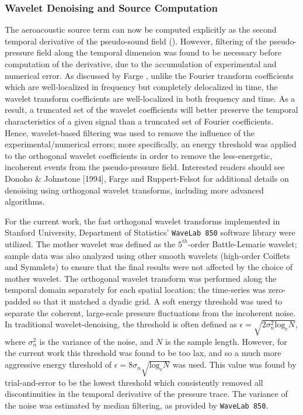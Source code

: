 \subsubsection{Wavelet Denoising and Source Computation}
The aeroacoustic source term can now be computed explicitly as the second temporal derivative of the pseudo-sound field ().
However, filtering of the pseudo-pressure field along the temporal dimension was found to be necessary before computation of the derivative, due to the accumulation of experimental and numerical error.
As discussed by Farge \citep{Farge1992}, unlike the Fourier transform coefficients which are well-localized in frequency but completely delocalized in time, the wavelet transform coefficients are well-localized in both frequency and time. 
As a result, a truncated set of the wavelet coefficients will better preserve the temporal characteristics of a given signal than a truncated set of Fourier coefficients.
Hence, wavelet-based filtering was used to remove the influence of the experimental/numerical errors; more specifically, an energy threshold was applied to the orthogonal wavelet coefficients in order to remove the less-energetic, incoherent events from the pseudo-pressure field.
Interested readers should see Donoho \& Johnstone [1994], Farge \etal [1999] and Ruppert-Felsot \etal [2009] for additional details on denoising using orthogonal wavelet transforms, including more advanced algorithms.

For the current work, the fast orthogonal wavelet transforms implemented in Stanford University, Department of Statistics' \texttt{WaveLab 850} software library were utilized.
The mother wavelet was defined as the $5^{th}$-order Battle-Lemarie wavelet; sample data was also analyzed using other smooth wavelets (high-order Coiflets and Symmlets) to ensure that the final results were not affected by the choice of mother wavelet.
The orthogonal wavelet transform was performed along the temporal domain separately for each spatial location; the time-series was zero-padded so that it matched a dyadic grid.
A soft energy threshold was used to separate the coherent, large-scale pressure fluctuations from the incoherent noise.
In traditional wavelet-denoising, the threshold is often defined as $\epsilon = \sqrt{2 \sigma^2_n \mathrm{log}_e N}$, where $\sigma^2_n$ is the variance of the noise, and $N$ is the sample length.
However, for the current work this threshold was found to be too lax, and so a much more aggressive energy threshold of $\epsilon = 8 \sigma_n \sqrt{ \mathrm{log}_e N}$ was used.
This value was found by trial-and-error to be the lowest threshold which consistently removed all discontinuities in the temporal derivative of the pressure trace.
The variance of the noise was estimated by median filtering, as provided by \texttt{WaveLab 850}.

